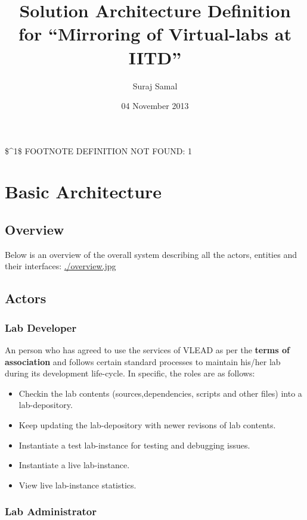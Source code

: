 \documentclass[11pt]{article}
\title{Solution Architecture Definition for ``Mirroring of Virtual-labs at IITD''}
\author{Suraj Samal}
\date{04 November 2013}
\begin{document}
\maketitle

\setcounter{tocdepth}{3}
\tableofcontents
\vspace*{1cm}

\listoftables
\listoffigures


\$\^{}{1}\$ FOOTNOTE DEFINITION NOT FOUND: 1

\section{Basic Architecture}
\label{sec-1}

\subsection{Overview}
\label{sec-1.1}

   Below is an overview of the overall system
   describing all the actors, entities and their interfaces:
   \hyperref[sec-1.1]{ ./overview.jpg }
\subsection{Actors}
\label{sec-1.2}

\subsubsection{Lab Developer}
\label{sec-1.2.1}

   An person who has agreed to use the services of VLEAD as per the
   \textbf{terms of association} and follows certain standard processes to
   maintain his/her lab during its development life-cycle. In
   specific, the roles are as follows:
\begin{itemize}
\item Checkin the lab contents (sources,dependencies, scripts and other files) into a lab-depository.
\item Keep updating the lab-depository with newer revisons of lab contents.
\item Instantiate a test lab-instance for testing and debugging issues.
\item Instantiate a live lab-instance.
\item View live lab-instance statistics.
\end{itemize}
\subsubsection{Lab Administrator}
\label{sec-1.2.2}
\end{document}
